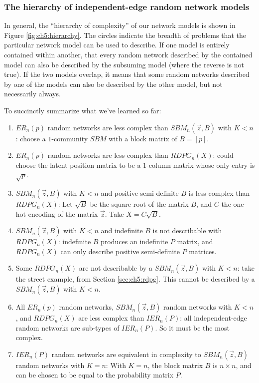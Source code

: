 \subsubsection{The hierarchy of independent-edge random network models}

In general, the ``hierarchy of complexity'' of our network models is shown in Figure \ref{fig:ch5:hierarchy}. The circles indicate the breadth of problems that the particular network model can be used to describe. If one model is entirely contained within another, that every random network described by the contained model can also be described by the subsuming model (where the reverse is not true). If the two models overlap, it means that some random networks described by one of the models can also be described by the other model, but not necessarily always.

To succinctly summarize what we've learned so far:
\begin{enumerate}
    \item $ER_n(p)$ random networks are less complex than $SBM_n(\vec z, B)$ with $K < n$: choose a $1$-community $SBM$ with a block matrix of $B = [p]$.
    \item $ER_n(p)$ random networks are less complex than $RDPG_n(X)$: could choose the latent position matrix to be a $1$-column matrix whose only entry is $\sqrt p$.
    \item $SBM_n(\vec z, B)$ with $K < n$ and positive semi-definite $B$ is less complex than $RDPG_n(X)$: Let $\sqrt B$ be the square-root of the matrix $B$, and $C$ the one-hot encoding of the matrix $\vec z$. Take $X = C\sqrt B$.
    \item $SBM_n(\vec z, B)$ with $K < n$ and indefinite $B$ is not describable with $RDPG_n(X)$: indefinite $B$ produces an indefinite $P$ matrix, and $RDPG_n(X)$ can only describe positive semi-definite $P$ matrices.
    \item Some $RDPG_n(X)$ are not describable by a $SBM_n(\vec z, B)$ with $K < n$: take the street example, from Section \ref{sec:ch5:rdpg}. This cannot be described by a $SBM_n(\vec z, B)$ with $K < n$.
    \item All $ER_n(p)$ random networks, $SBM_n(\vec z, B)$ random networks with $K < n$, and $RDPG_n(X)$ are less complex than $IER_n(P)$: all independent-edge random networks are sub-types of $IER_n(P)$. So it must be the most complex.
    \item $IER_n(P)$ random networks are equivalent in complexity to $SBM_n(\vec z, B)$ random networks with $K = n$: With $K = n$, the block matrix $B$ is $n \times n$, and can be chosen to be equal to the probability matrix $P$.
\end{enumerate}

